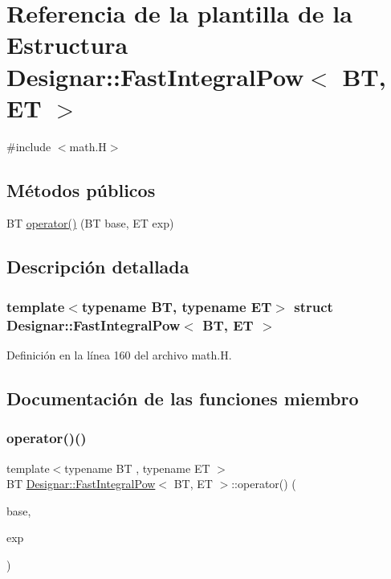 \hypertarget{struct_designar_1_1_fast_integral_pow}{}\section{Referencia de la plantilla de la Estructura Designar\+:\+:Fast\+Integral\+Pow$<$ BT, ET $>$}
\label{struct_designar_1_1_fast_integral_pow}


{\ttfamily \#include $<$math.\+H$>$}

\subsection*{Métodos públicos}
\begin{DoxyCompactItemize}
\item 
BT \hyperlink{struct_designar_1_1_fast_integral_pow_a0c78ecac21d1454b9bdae4620c3473db}{operator()} (BT base, ET exp)
\end{DoxyCompactItemize}


\subsection{Descripción detallada}
\subsubsection*{template$<$typename BT, typename ET$>$\newline
struct Designar\+::\+Fast\+Integral\+Pow$<$ B\+T, E\+T $>$}



Definición en la línea 160 del archivo math.\+H.



\subsection{Documentación de las funciones miembro}
\mbox{\label{struct_designar_1_1_fast_integral_pow_a0c78ecac21d1454b9bdae4620c3473db}} 
\subsubsection{\texorpdfstring{operator()()}{operator()()}}
{\footnotesize\ttfamily template$<$typename BT , typename ET $>$ \\
BT \hyperlink{struct_designar_1_1_fast_integral_pow}{Designar\+::\+Fast\+Integral\+Pow}$<$ BT, ET $>$\+::operator() (\begin{DoxyParamCaption}\item[{BT}]{base,  }\item[{ET}]{exp }\end{DoxyParamCaption})\hspace{0.3cm}{\ttfamily [inline]}}



